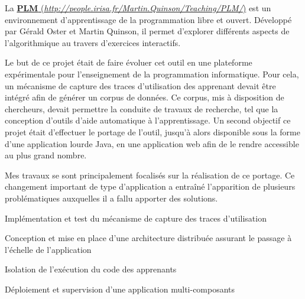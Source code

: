 \documentclass[12pt, a4paper]{awesome-cv}
\newcommand{\customlink}[2]{
  \href{#2}{\textbf{#1} (\emph{#2})}
}
\begin{document}
\begin{cventries}

  \begin{cvparagraph}
    La \customlink{PLM}{http://people.irisa.fr/Martin.Quinson/Teaching/PLM/} est un environnement d’apprentissage de la programmation libre et ouvert.
    Développé par Gérald Oster et Martin Quinson, il permet d’explorer différents aspects de l’algorithmique au travers d’exercices interactifs.

    Le but de ce projet était de faire évoluer cet outil en une plateforme expérimentale pour l'enseignement de la programmation informatique.
    Pour cela, un mécanisme de capture des traces d'utilisation des apprenant devait être intégré afin de générer un corpus de données.
    Ce corpus, mis à disposition de chercheurs, devait permettre la conduite de travaux de recherche, tel que la conception d'outils d'aide automatique à l'apprentissage.
    Un second objectif ce projet était d'effectuer le portage de l'outil, jusqu'à alors disponible sous la forme d'une application lourde Java, en une application web afin de le rendre accessible au plus grand nombre.

    Mes travaux se sont principalement focalisés sur la réalisation de ce portage.
    Ce changement important de type d'application a entraîné l'apparition de plusieurs problématiques auxquelles il a fallu apporter des solutions.

    \begin{tightemize}
    \item Implémentation et test du mécanisme de capture des traces d'utilisation
    \item Conception et mise en place d'une architecture distribuée assurant le passage à l'échelle de l'application
    \item Isolation de l'exécution du code des apprenants
    \item Déploiement et supervision d'une application multi-composants
    \end{tightemize}
  \end{cvparagraph}


\end{cventries}
\end{document}
